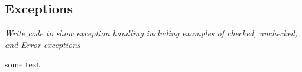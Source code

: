 \subsection{Exceptions}
\textit{Write code to show exception handling including examples of checked, unchecked, and Error exceptions}

 some text
